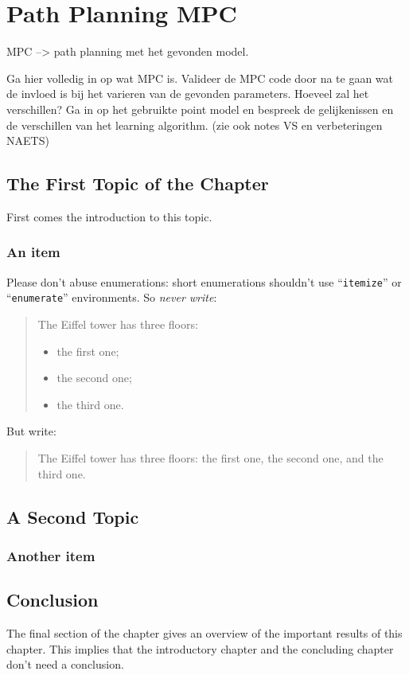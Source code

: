 \chapter{Path Planning MPC}
\label{cha:3}

MPC --> path planning met het gevonden model.

Ga hier volledig in op wat MPC is.
Valideer de MPC code door na te gaan wat de invloed is bij het varieren van de gevonden parameters.
Hoeveel zal het verschillen? Ga in op het gebruikte point model en bespreek de gelijkenissen en de verschillen van het learning algorithm. (zie ook notes VS en verbeteringen NAETS)




\section{The First Topic of the Chapter}
First comes the introduction to this topic.



\subsection{An item}
Please don't abuse enumerations: short enumerations shouldn't use
``\verb|itemize|'' or ``\texttt{enumerate}'' environments.
So \emph{never write}: 
\begin{quote}
	The Eiffel tower has three floors:
	\begin{itemize}
		\item the first one;
		\item the second one;
		\item the third one.
	\end{itemize}
\end{quote}
But write:
\begin{quote}
	The Eiffel tower has three floors: the first one, the second one, and the
	third one.
\end{quote}

\section{A Second Topic}


\subsection{Another item}


\section{Conclusion}
The final section of the chapter gives an overview of the important results
of this chapter. This implies that the introductory chapter and the
concluding chapter don't need a conclusion.
